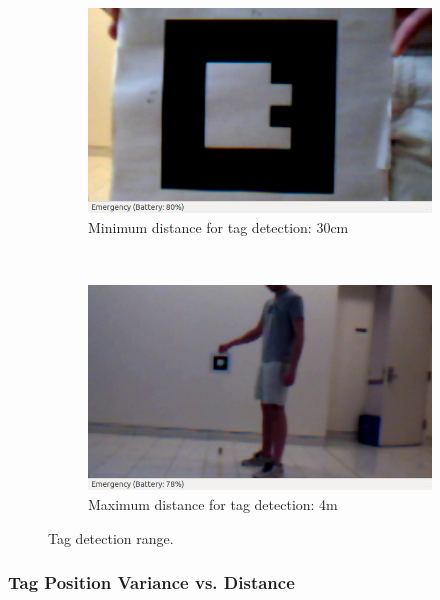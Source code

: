 			\begin{figure}[ht]
			        \centering
			        \begin{subfigure}[b]{0.45\textwidth}
			                \centering
			                \includegraphics[width=\textwidth]{../images/min_distance.png}
			                \caption{Minimum distance for tag detection: 30cm}\label{fig:tagclose}
			        \end{subfigure}%
			        ~
			        \begin{subfigure}[b]{0.45\textwidth}
			                \centering
			                \includegraphics[width=\textwidth]{../images/max_dist2.png}
			                \caption{Maximum distance for tag detection: 4m}\label{fig:tagfar}
			        \end{subfigure}
			        \caption{Tag detection range.} \label{fig:extremes}
			\end{figure}

		\subsubsection{Tag Position Variance vs. Distance}

